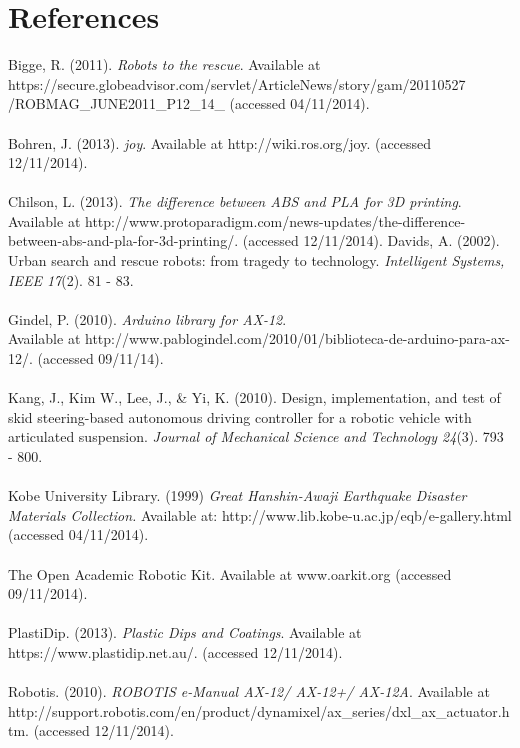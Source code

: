 \documentclass[]{article}
\begin{document}
\section{References}
Bigge, R. (2011). \textit{Robots to the rescue}. Available at\\
https://secure.globeadvisor.com/servlet/ArticleNews/story/gam/20110527\\
/ROBMAG\_JUNE2011\_P12\_14\_ (accessed 04/11/2014).\\
\\
Bohren, J. (2013). \textit{joy}. Available at http://wiki.ros.org/joy. (accessed 12/11/2014).\\
\\
Chilson, L. (2013). \textit{The difference between ABS and PLA for 3D printing}. Available at http://www.protoparadigm.com/news-updates/the-difference-between-abs-and-pla-for-3d-printing/. (accessed 12/11/2014).
Davids, A. (2002). Urban search and rescue robots: from tragedy to technology. \textit{Intelligent Systems, IEEE 17}(2). 81 - 83.\\
\\
Gindel, P. (2010). \textit{Arduino library for AX-12}. \\Available at http://www.pablogindel.com/2010/01/biblioteca-de-arduino-para-ax-12/. (accessed 09/11/14).\\
\\
Kang, J., Kim W., Lee, J., \& Yi, K. (2010). Design, implementation, and test of skid steering-based autonomous driving controller for a robotic vehicle with articulated suspension. \textit{Journal of Mechanical Science and Technology 24}(3). 793 - 800.\\
\\
Kobe University Library. (1999) \textit{Great Hanshin-Awaji Earthquake Disaster Materials Collection.} Available at: http://www.lib.kobe-u.ac.jp/eqb/e-gallery.html (accessed 04/11/2014).\\
\\
The Open Academic Robotic Kit. Available at www.oarkit.org (accessed 09/11/2014).\\
\\
PlastiDip. (2013). \textit{Plastic Dips and Coatings}. Available at https://www.plastidip.net.au/. (accessed 12/11/2014).\\
\\
Robotis. (2010). \textit{ROBOTIS e-Manual AX-12/ AX-12+/ AX-12A}. Available at http://support.robotis.com/en/product/dynamixel/ax\_series/dxl\_ax\_actuator.htm. (accessed 12/11/2014).\\
\end{document}
